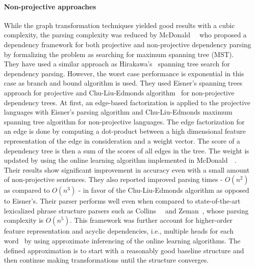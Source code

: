 \paragraph{Non-projective approaches}
While the graph transformation techniques yielded good results with a cubic complexity, the parsing complexity was reduced by McDonald~\etal~\cite{McDonald:2005:NDP:1220575.1220641} who proposed a dependency framework for both projective and non-projective dependency parsing by formalizing the problem as searching for maximum spanning tree (MST). They have used a similar approach as Hirakawa's~\cite{hirakawa2001semantic} spanning tree search for dependency parsing. However, the worst case performance is exponential in this case as branch and bound algorithm is used. They used Eisner's spanning trees approach for projective and Chu-Liu-Edmonds algorithm~\cite{chu1965shortest,edmonds1967optimum} for non-projective dependency trees. At first, an edge-based factorization is applied to the projective languages with Eisner's parsing algorithm and Chu-Liu-Edmonds maximum spanning tree algorithm for non-projective languages. The edge factorization for an edge is done by computing a dot-product between a high dimensional feature representation of the edge in consideration and a weight vector. The score of a dependency tree is then a sum of the scores of all edges in the tree. The weight is updated by using the online learning algorithm implemented in McDonald~\etal~\cite{McDonald:2005:OLT:1219840.1219852}. Their results show significant improvement in accuracy even with a small amount of non-projective sentences. They also reported improved parsing times - $O(n^2)$ as compared to $O(n^3)$ - in favor of the Chu-Liu-Edmonds algorithm as opposed to Eisner's. Their parser performs well even when compared to state-of-the-art lexicalized phrase structure parsers such as 
Collins~\etal~\cite{collins1999statistical} and Zeman~\cite{zeman2004parsing}, whose parsing complexity is $O(n^5)$. This framework was further account for higher-order feature representation and acyclic dependencies, i.e., multiple heads for each word~\cite{mcdonald2006online} by using approximate inferencing of the online learning algorithms. The defined approximation is to start with a reasonably good baseline structure and then continue making transformations until the structure converges. 

